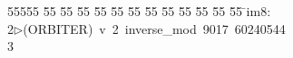 %
%
\begin{tabbing}
55555 \= 55 \= 55 \= 55 \= 55 \= 55 \= 55 \= 55 \= 55 \= 55 \= 55 \= 55 \= 55 \= \>im8:\\[0pt]
2\>$\triangleright$\>(ORBITER)\ v\ 2\ inverse\_mod\ 9017\ 60240544\\[0pt]
3\>\end{tabbing}
